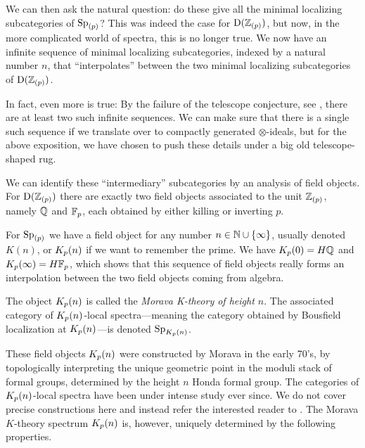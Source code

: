 We can then ask the natural question: do these give all the minimal localizing subcategories of $\mathrm{Sp}_{(p)}$? This was indeed the case for $\mathrm{D}(\mathbb{Z}_{(p)})$, but now, in the more complicated world of spectra, this is no longer true. We now have an infinite sequence of minimal localizing subcategories, indexed by a natural number $n$, that ``interpolates'' between the two minimal localizing subcategories of $\mathrm{D}(\mathbb{Z}_{(p)})$. 

\begin{remark}
    In fact, even more is true: By the failure of the telescope conjecture, see \cite{burklund-hahn-levy-schlank_23}, there are at least two such infinite sequences. We can make sure that there is a single such sequence if we translate over to compactly generated $\otimes$-ideals, but for the above exposition, we have chosen to push these details under a big old telescope-shaped rug.
\end{remark}

We can identify these ``intermediary'' subcategories by an analysis of field objects. For $\mathrm{D}(\mathbb{Z}_{(p)})$ there are exactly two field objects associated to the unit $\mathbb{Z}_{(p)}$, namely $\mathbb{Q}$ and $\mathbb{F}_p$, each obtained by either killing or inverting $p$. 

For $\mathrm{Sp}_{(p)}$ we have a field object for any number $n\in \mathbb{N}\cup \{\infty\}$, usually denoted $K(n)$, or ${K_p(n)}$ if we want to remember the prime. We have $K_p(0)=H\mathbb{Q}$ and $K_p(\infty) = H\mathbb{F}_p$, which shows that this sequence of field objects really forms an interpolation between the two field objects coming from algebra. 

\begin{notation}
    The object ${K_p(n)}$ is called the \emph{Morava K-theory of height $n$}. The associated category of ${K_p(n)}$-local spectra---meaning the category obtained by Bousfield localization at ${K_p(n)}$---is denoted $\mathrm{Sp}_{{K_p(n)}}$. 
\end{notation}

These field objects ${K_p(n)}$ were constructed by Morava in the early 70's, by topologically interpreting the unique geometric point in the moduli stack of formal groups, determined by the height $n$ Honda formal group. The categories of ${K_p(n)}$-local spectra have been under intense study ever since. We do not cover precise constructions here and instead refer the interested reader to \cite{hovey-strickland_99}. The Morava $K$-theory spectrum ${K_p(n)}$ is, however, uniquely determined by the following properties. 


